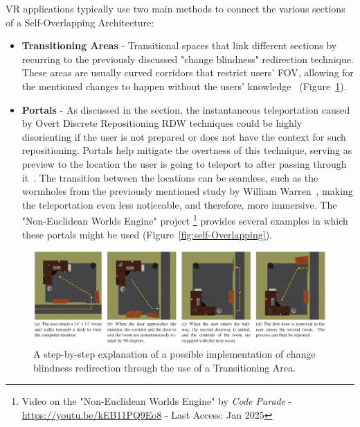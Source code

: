 \gls{VR} applications typically use two main methods to connect the various sections of a Self-Overlapping Architecture: 

\begin{itemize}

    \item \textbf{Transitioning Areas} - Transitional spaces that link different sections by recurring to the previously discussed 
    "change blindness" redirection technique. These areas are usually curved corridors that restrict users' \gls{FOV}, 
    allowing for the mentioned changes to happen without the users' knowledge~\cite{5759455, Vasylevska2017} (Figure~\ref{fig:transioning-areas}).
    
    \item \textbf{Portals} - As discussed in the  section, 
    the instantaneous teleportation caused by Overt Discrete Repositioning \gls{RDW} techniques could be highly disorienting if the user is 
    not prepared or does not have the context for such repositioning. Portals help mitigate the overtness of this technique, serving as preview 
    to the location the user is going to teleport to after passing through it~\cite{Freitag2014}. The transition between the locations can 
    be seamless, such as the wormholes from the previously mentioned study by William Warren~\cite{Warren2019}, 
    making the teleportation even less noticeable, and therefore, more immersive. 
    The "Non-Euclidean Worlds Engine" project 
    \footnote{Video on the "Non-Euclidean Worlds Engine" by \textit{Code Parade} - \href{https://youtu.be/kEB11PQ9Eo8}{https://youtu.be/kEB11PQ9Eo8} - Last Access: Jan 2025 }
    provides several examples in which these portals might be used (Figure~\ref{fig:self-Overlapping}).

\end{itemize}

\begin{figure}[b]
    \centering
    \includegraphics[width=\textwidth]{NOVAthesisFiles/Images/papers/transioning-areas.png}
    \caption[Possible implementation of change-blindness redirection]
    {A step-by-step explanation of a possible implementation of change blindness redirection through the use of a Transitioning Area. 
   ~\cite{5759455}}
    \label{fig:transioning-areas}
\end{figure}

